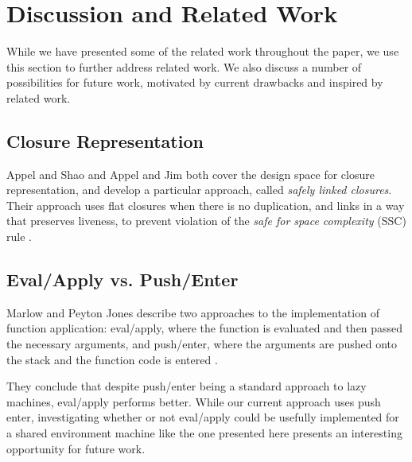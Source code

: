 \section{Discussion and Related Work} \label{sec:disc}

While we have presented some of the related work throughout the paper, we use
this section to further address related work. We also discuss a number of
possibilities for future work, motivated by current drawbacks and inspired by
related work. 

\subsection{Closure Representation}

Appel and Shao \cite{shao1994space} and Appel and Jim \cite{appel1988optimizing}
both cover the design space for closure representation, and develop a particular
approach, called \emph{safely linked closures}. Their approach uses flat
closures when there is no duplication, and links in a way that preserves
liveness, to prevent violation of the \emph{safe for space complexity} (SSC)
rule \cite{appel2006compiling}.

\subsection{Eval/Apply vs. Push/Enter}

Marlow and Peyton Jones describe two approaches to the implementation of
function application: eval/apply, where the function is evaluated and then
passed the necessary arguments, and push/enter, where the arguments are pushed
onto the stack and the function code is entered \cite{marlow2006making}.

They conclude that despite push/enter being a standard approach to lazy
machines, eval/apply performs better. While our current approach uses push
enter, investigating whether or not eval/apply could be usefully implemented for
a shared environment machine like the one presented here presents an interesting
opportunity for future work.

